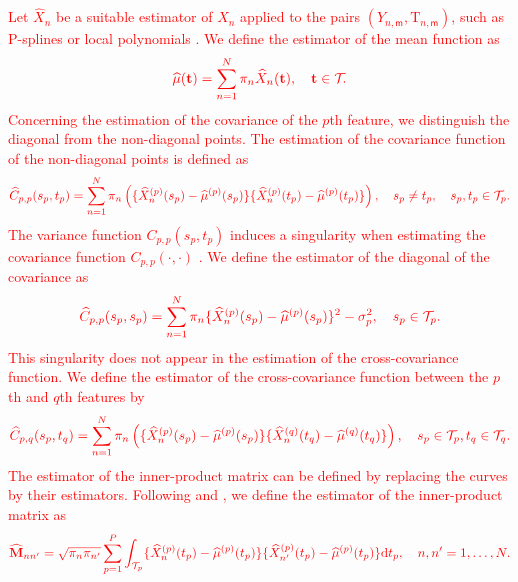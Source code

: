 \textcolor{red}{Let $\widehat{X}_n$ be a suitable estimator of $X_n$ applied to the pairs $(Y_{n, \mathsf{m}}, \mathrm{T}_{n, \mathsf{m}})$, such as P-splines \cite[e.g.][]{eilersTwentyYearsPsplines2015} or local polynomials \cite[e.g.][]{fanLocalPolynomialModelling1996}. We define the estimator of the mean function as}
\begin{equation}
    \textcolor{red}{\widehat{\mu}(\mathbf{t}) = \sum_{n = 1}^N \pi_n \widehat{X}_n(\mathbf{t}), \quad \mathbf{t} \in \mathcal{T}_{}.}
\end{equation}
\textcolor{red}{Concerning the estimation of the covariance of the $p$th feature, we distinguish the diagonal from the non-diagonal points. The estimation of the covariance function of the non-diagonal points is defined as}
\begin{equation}\label{eq:cov_estimation}
    \textcolor{red}{\widehat{C}_{p, p}(s_p, t_p) = \sum_{n = 1}^N \pi_n\left(\{\widehat{X}_n^{(p)}(s_p) - \widehat{\mu}^{(p)}(s_p)\}\{\widehat{X}_n^{(p)}(t_p) - \widehat{\mu}^{(p)}(t_p)\}\right), \quad s_p \neq t_p, \quad s_p, t_p \in \mathcal{T}_{p}.}
\end{equation}
\textcolor{red}{The variance function $C_{p, p}(s_p, t_p)$ induces a singularity when estimating the covariance function $C_{p, p}(\cdot, \cdot)$ \cite[see][]{yaoFunctionalDataAnalysis2005,zhangSparseDenseFunctional2016}. We define the estimator of the diagonal of the covariance as}
\begin{equation}
    \textcolor{red}{\widehat{C}_{p, p}(s_p, s_p) = \sum_{n = 1}^N \pi_n\{\widehat{X}_n^{(p)}(s_p) - \widehat{\mu}^{(p)}(s_p)\}^2 - \sigma_p^2, \quad s_p \in \mathcal{T}_{p}.}
\end{equation}
\textcolor{red}{This singularity does not appear in the estimation of the cross-covariance function. We define the estimator of the cross-covariance function between the $p$th and $q$th features by}
\begin{equation}
    \textcolor{red}{\widehat{C}_{p, q}(s_p, t_q) = \sum_{n = 1}^N \pi_n\left(\{\widehat{X}_n^{(p)}(s_p) - \widehat{\mu}^{(p)}(s_p)\}\{\widehat{X}_n^{(q)}(t_q) - \widehat{\mu}^{(q)}(t_q)\}\right), \quad s_p \in \mathcal{T}_{p}, t_q \in \mathcal{T}_{q}.}
\end{equation}
\textcolor{red}{The estimator of the inner-product matrix can be defined by replacing the curves by their estimators. Following \cite{benkoCommonFunctionalPrincipal2009} and \cite{grithFunctionalPrincipalComponent2018}, we define the estimator of the inner-product matrix as}
\begin{equation}
    \textcolor{red}{\widehat{\mathbf{M}}_{nn^\prime} = \sqrt{\pi_n \pi_{n^{\prime}}}\sum_{p = 1}^P \int_{\mathcal{T}_{p}}\{\widehat{X}_n^{(p)}(t_p) - \widehat{\mu}^{(p)}(t_p)\}\{\widehat{X}^{(p)}_{n^\prime}(t_p) - \widehat{\mu}^{(p)}(t_p)\} {\rm d} t_p, \quad n, n^\prime = 1, \dots, N.}
\end{equation}
